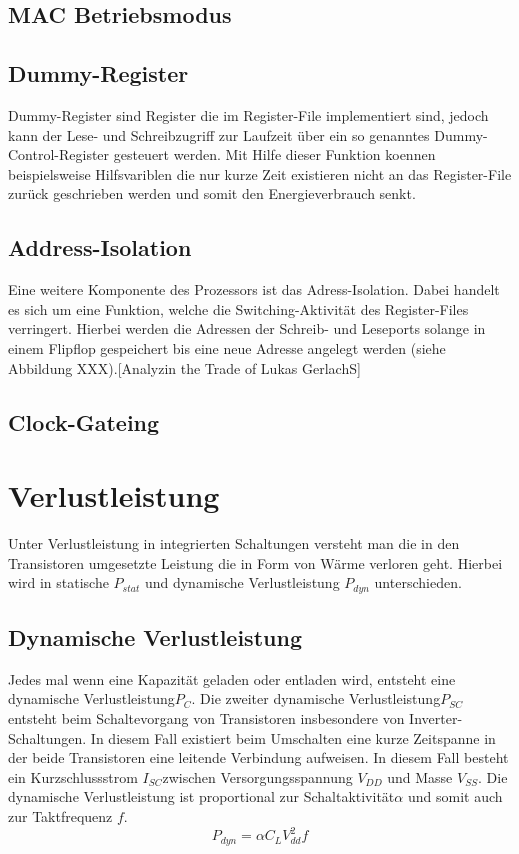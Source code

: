 \subsection{MAC Betriebsmodus}\label{subsec:macMode}

\subsection{Dummy-Register}\label{subsec:dummy}
Dummy-Register sind Register die im Register-File implementiert sind, jedoch kann der Lese- und Schreibzugriff zur Laufzeit über ein so genanntes Dummy-Control-Register gesteuert werden. Mit Hilfe dieser Funktion koennen beispielsweise Hilfsvariblen die nur kurze Zeit existieren nicht an das Register-File zurück geschrieben werden und somit den Energieverbrauch senkt. 

\subsection{Address-Isolation}\label{subsec:add_iso}
Eine weitere Komponente des Prozessors ist das Adress-Isolation. Dabei handelt es sich um eine Funktion, welche die Switching-Aktivität des Register-Files verringert. Hierbei werden die Adressen der Schreib- und Leseports solange in einem Flipflop gespeichert bis eine neue Adresse angelegt werden (siehe Abbildung XXX).[Analyzin the Trade of Lukas GerlachS]

\subsection{Clock-Gateing}\label{subsec:clock-gate}

\section{Verlustleistung}
\label{sec:verlustleistung}
Unter Verlustleistung in integrierten Schaltungen versteht man die in den Transistoren umgesetzte Leistung die in Form von Wärme verloren geht.
Hierbei wird in statische \(P_{stat}\) und dynamische Verlustleistung \(P_{dyn}\) unterschieden. 
\subsection{Dynamische Verlustleistung}\label{subsec:dynVerl}
Jedes mal wenn eine Kapazität geladen oder entladen wird, entsteht eine dynamische Verlustleistung\(P_C\). Die zweiter dynamische Verlustleistung\(P_{SC}\) entsteht beim Schaltevorgang von Transistoren insbesondere von Inverter-Schaltungen. In diesem Fall existiert beim Umschalten eine kurze Zeitspanne in der beide Transistoren eine leitende Verbindung aufweisen. In diesem Fall besteht ein Kurzschlussstrom \(I_{SC}\)zwischen Versorgungsspannung \(V_{DD}\) und Masse \(V_{SS}\). Die dynamische Verlustleistung ist proportional zur Schaltaktivität\(\alpha\) und somit auch zur Taktfrequenz $f$.
\begin{equation}
P_{dyn} = \alpha  C_L  V_{dd}^{2}  f
\label{eq:dynVerlustleistung}
\end{equation}
